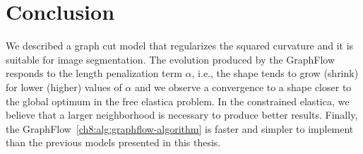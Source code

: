 \section{Conclusion}
We described a graph cut model that regularizes the squared curvature and it is suitable for image segmentation. The evolution produced by the GraphFlow responds to the length penalization term $\alpha$, i.e., the shape tends to grow (shrink) for lower (higher) values of $\alpha$ and we observe a convergence to a shape closer to the global optimum in the free elastica problem. In the constrained elastica, we believe that a larger neighborhood is necessary to produce better results.  Finally, the GraphFlow~\cref{ch8:alg:graphflow-algorithm} is faster and simpler to implement than the previous models presented in this thesis.
